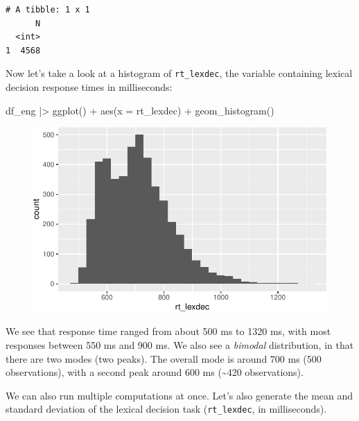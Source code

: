 \documentclass[
  letterpaper,
  DIV=11,
  numbers=noendperiod]{scrartcl}
\newenvironment{Shaded}{\begin{snugshade}}{\end{snugshade}}
\newcommand{\AttributeTok}[1]{\textcolor[rgb]{0.40,0.45,0.13}{#1}}
\newcommand{\FunctionTok}[1]{\textcolor[rgb]{0.28,0.35,0.67}{#1}}
\newcommand{\NormalTok}[1]{\textcolor[rgb]{0.00,0.23,0.31}{#1}}
\newcommand{\SpecialCharTok}[1]{\textcolor[rgb]{0.37,0.37,0.37}{#1}}
\begin{document}
\begin{verbatim}
# A tibble: 1 x 1
      N
  <int>
1  4568
\end{verbatim}

Now let's take a look at a histogram of \texttt{rt\_lexdec}, the
variable containing lexical decision response times in milliseconds:

\begin{Shaded}
\begin{Highlighting}[]
\NormalTok{df\_eng }\SpecialCharTok{|\textgreater{}} 
  \FunctionTok{ggplot}\NormalTok{() }\SpecialCharTok{+}
  \FunctionTok{aes}\NormalTok{(}\AttributeTok{x =}\NormalTok{ rt\_lexdec) }\SpecialCharTok{+}
  \FunctionTok{geom\_histogram}\NormalTok{()}
\end{Highlighting}
\end{Shaded}

\begin{figure}[H]

{\centering \includegraphics{08-desc_stats_en_files/figure-pdf/unnamed-chunk-39-1.pdf}

}

\end{figure}

We see that response time ranged from about 500 ms to 1320 ms, with most
responses between 550 ms and 900 ms. We also see a \emph{bimodal}
distribution, in that there are two modes (two peaks). The overall mode
is around 700 ms (500 observations), with a second peak around 600 ms
(\textasciitilde420 observations).

We can also run multiple computations at once. Let's also generate the
mean and standard deviation of the lexical decision task
(\texttt{rt\_lexdec}, in milliseconds).
\end{document}
